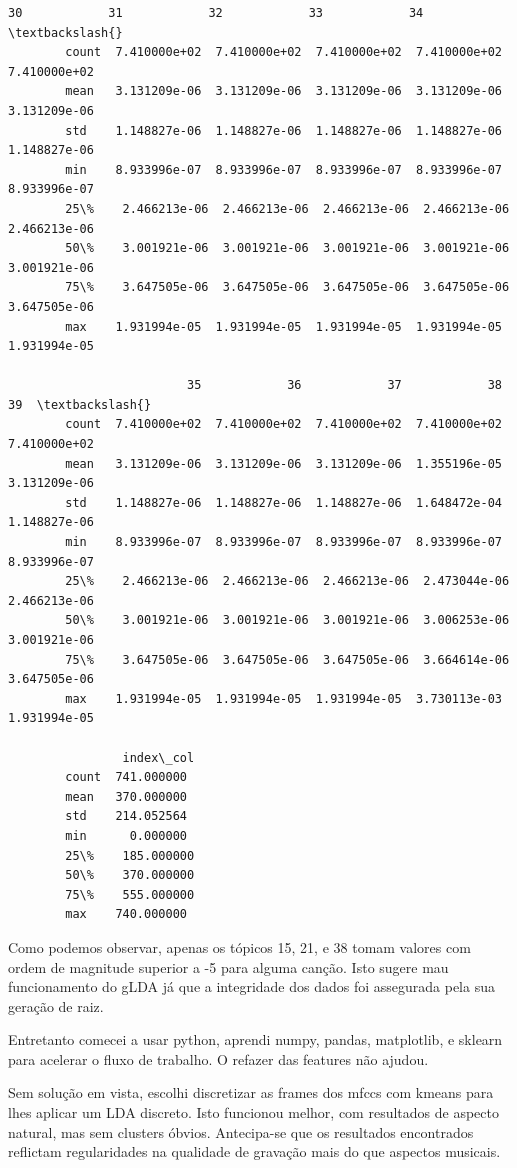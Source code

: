 \documentclass[11pt]{article}
\begin{document}
\begin{Verbatim}[commandchars=\\\{\}]
                         30            31            32            33            34  \textbackslash{}
        count  7.410000e+02  7.410000e+02  7.410000e+02  7.410000e+02  7.410000e+02   
        mean   3.131209e-06  3.131209e-06  3.131209e-06  3.131209e-06  3.131209e-06   
        std    1.148827e-06  1.148827e-06  1.148827e-06  1.148827e-06  1.148827e-06   
        min    8.933996e-07  8.933996e-07  8.933996e-07  8.933996e-07  8.933996e-07   
        25\%    2.466213e-06  2.466213e-06  2.466213e-06  2.466213e-06  2.466213e-06   
        50\%    3.001921e-06  3.001921e-06  3.001921e-06  3.001921e-06  3.001921e-06   
        75\%    3.647505e-06  3.647505e-06  3.647505e-06  3.647505e-06  3.647505e-06   
        max    1.931994e-05  1.931994e-05  1.931994e-05  1.931994e-05  1.931994e-05   
        
                         35            36            37            38            39  \textbackslash{}
        count  7.410000e+02  7.410000e+02  7.410000e+02  7.410000e+02  7.410000e+02   
        mean   3.131209e-06  3.131209e-06  3.131209e-06  1.355196e-05  3.131209e-06   
        std    1.148827e-06  1.148827e-06  1.148827e-06  1.648472e-04  1.148827e-06   
        min    8.933996e-07  8.933996e-07  8.933996e-07  8.933996e-07  8.933996e-07   
        25\%    2.466213e-06  2.466213e-06  2.466213e-06  2.473044e-06  2.466213e-06   
        50\%    3.001921e-06  3.001921e-06  3.001921e-06  3.006253e-06  3.001921e-06   
        75\%    3.647505e-06  3.647505e-06  3.647505e-06  3.664614e-06  3.647505e-06   
        max    1.931994e-05  1.931994e-05  1.931994e-05  3.730113e-03  1.931994e-05   
        
                index\_col  
        count  741.000000  
        mean   370.000000  
        std    214.052564  
        min      0.000000  
        25\%    185.000000  
        50\%    370.000000  
        75\%    555.000000  
        max    740.000000  
\end{Verbatim}
            
    Como podemos observar, apenas os tópicos 15, 21, e 38 tomam valores com
ordem de magnitude superior a -5 para alguma canção. Isto sugere mau
funcionamento do gLDA já que a integridade dos dados foi assegurada pela
sua geração de raiz.

    Entretanto comecei a usar python, aprendi numpy, pandas, matplotlib, e
sklearn para acelerar o fluxo de trabalho. O refazer das features não
ajudou.

Sem solução em vista, escolhi discretizar as frames dos mfccs com kmeans
para lhes aplicar um LDA discreto. Isto funcionou melhor, com resultados
de aspecto natural, mas sem clusters óbvios. Antecipa-se que os
resultados encontrados reflictam regularidades na qualidade de gravação
mais do que aspectos musicais.
\end{document}
